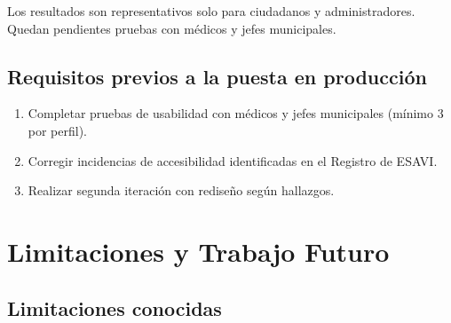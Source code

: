\documentclass[12pt,letterpaper]{article}
\begin{document}
Los resultados son representativos solo para ciudadanos y administradores. Quedan pendientes pruebas con médicos y jefes municipales.

\subsection{Requisitos previos a la puesta en producción}

\begin{enumerate}
    \item Completar pruebas de usabilidad con médicos y jefes municipales (mínimo 3 por perfil).
    \item Corregir incidencias de accesibilidad identificadas en el Registro de ESAVI.
    \item Realizar segunda iteración con rediseño según hallazgos.
\end{enumerate}





































	\section{Limitaciones y Trabajo Futuro}
	
	\subsection{Limitaciones conocidas}
\end{document}
